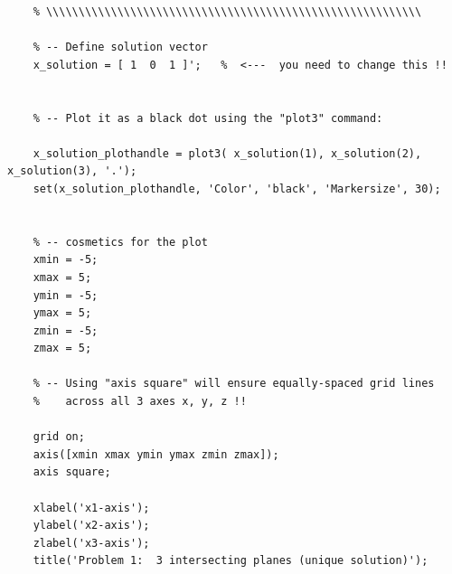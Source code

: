 \documentclass{article}
\begin{document}
\begin{verbatim}
    % \\\\\\\\\\\\\\\\\\\\\\\\\\\\\\\\\\\\\\\\\\\\\\\\\\\\\\\\\\
    
    % -- Define solution vector
    x_solution = [ 1  0  1 ]';   %  <---  you need to change this !!
    
    
    % -- Plot it as a black dot using the "plot3" command:
    
    x_solution_plothandle = plot3( x_solution(1), x_solution(2), x_solution(3), '.');
    set(x_solution_plothandle, 'Color', 'black', 'Markersize', 30);
    
    
    % -- cosmetics for the plot
    xmin = -5;
    xmax = 5;
    ymin = -5;
    ymax = 5;
    zmin = -5;
    zmax = 5;
    
    % -- Using "axis square" will ensure equally-spaced grid lines
    %    across all 3 axes x, y, z !!
    
    grid on;
    axis([xmin xmax ymin ymax zmin zmax]);
    axis square;
    
    xlabel('x1-axis');
    ylabel('x2-axis');
    zlabel('x3-axis');
    title('Problem 1:  3 intersecting planes (unique solution)');
    

\end{verbatim}
\end{document}
